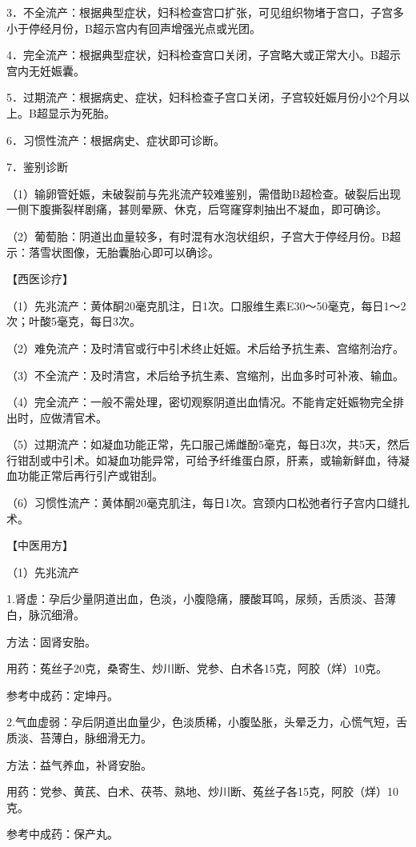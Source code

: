 \documentclass[12pt,UTF8,openany]{ctexbook}
\begin{document}
3．不全流产：根据典型症状，妇科检查宫口扩张，可见组织物堵于宫口，子宫多小于停经月份，B超示宫内有回声增强光点或光团。

4．完全流产：根据典型症状，妇科检查宫口关闭，子宫略大或正常大小。B超示宫内无妊娠囊。

5．过期流产：根据病史、症状，妇科检查子宫口关闭，子宫较妊娠月份小2个月以上。B超显示为死胎。

6．习惯性流产：根据病史、症状即可诊断。

7．鉴别诊断

（1）输卵管妊娠，未破裂前与先兆流产较难鉴别，需借助B超检查。破裂后出现一侧下腹撕裂样剧痛，甚则晕厥、休克，后穹窿穿刺抽出不凝血，即可确诊。

（2）葡萄胎：阴道出血量较多，有时混有水泡状组织，子宫大于停经月份。B超示：落雪状图像，无胎囊胎心即可以确诊。

【西医诊疗】

（1）先兆流产：黄体酮20毫克肌注，日1次。口服维生素E30～50毫克，每日1～2次；叶酸5毫克，每日3次。

（2）难免流产：及时清官或行中引术终止妊娠。术后给予抗生素、宫缩剂治疗。

（3）不全流产：及时清宫，术后给予抗生素、宫缩剂，出血多时可补液、输血。

（4）完全流产：一般不需处理，密切观察阴道出血情况。不能肯定妊娠物完全排出时，应做清官术。

（5）过期流产：如凝血功能正常，先口服己烯雌酚5毫克，每日3次，共5天，然后行钳刮或中引术。如凝血功能异常，可给予纤维蛋白原，肝素，或输新鲜血，待凝血功能正常后再行引产或钳刮。

（6）习惯性流产：黄体酮20毫克肌注，每日1次。宫颈内口松弛者行子宫内口缝扎术。

【中医用方】

（1）先兆流产

1.肾虚：孕后少量阴道出血，色淡，小腹隐痛，腰酸耳鸣，尿频，舌质淡、苔薄白，脉沉细滑。

方法：固肾安胎。

用药：菟丝子20克，桑寄生、炒川断、党参、白术各15克，阿胶（烊）10克。

参考中成药：定坤丹。

2.气血虚弱：孕后阴道出血量少，色淡质稀，小腹坠胀，头晕乏力，心慌气短，舌质淡、苔薄白，脉细滑无力。

方法：益气养血，补肾安胎。

用药：党参、黄芪、白术、茯苓、熟地、炒川断、菟丝子各15克，阿胶（烊）10克。

参考中成药：保产丸。
\end{document}

